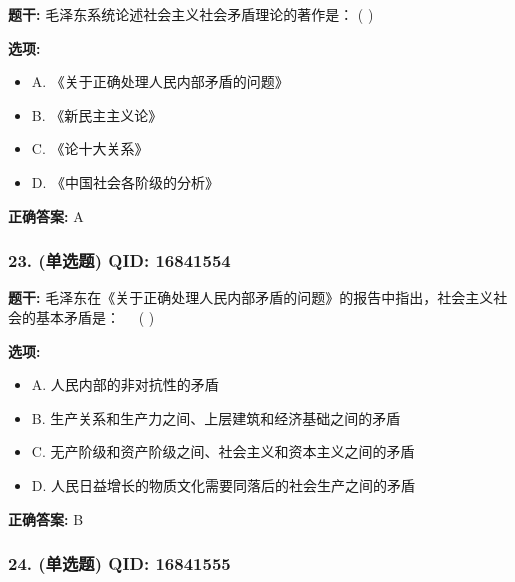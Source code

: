 \documentclass[12pt,UTF8]{ctexart}
\begin{document}
\textbf{题干:}
毛泽东系统论述社会主义社会矛盾理论的著作是： ( )

\textbf{选项:}
\begin{itemize}[leftmargin=*]

  \item A. 《关于正确处理人民内部矛盾的问题》

  \item B. 《新民主主义论》

  \item C. 《论十大关系》

  \item D. 《中国社会各阶级的分析》

\end{itemize}

\textbf{正确答案:}
A

\vspace{0.3em}\hrulefill\vspace{0.7em}

\subsubsection*{23. (单选题) \small QID: 16841554}

\textbf{题干:}
毛泽东在《关于正确处理人民内部矛盾的问题》的报告中指出，社会主义社会的基本矛盾是：   ( )

\textbf{选项:}
\begin{itemize}[leftmargin=*]

  \item A. 人民内部的非对抗性的矛盾

  \item B. 生产关系和生产力之间、上层建筑和经济基础之间的矛盾

  \item C. 无产阶级和资产阶级之间、社会主义和资本主义之间的矛盾

  \item D. 人民日益增长的物质文化需要同落后的社会生产之间的矛盾

\end{itemize}

\textbf{正确答案:}
B

\vspace{0.3em}\hrulefill\vspace{0.7em}

\subsubsection*{24. (单选题) \small QID: 16841555}
\end{document}
